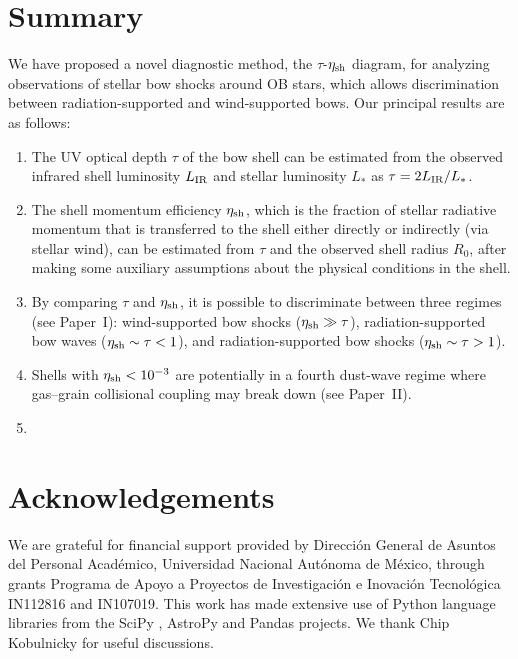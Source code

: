\documentclass[useAMS, usenatbib, a4paper]{mnras}
\begin{document}
\section{Summary}
\label{sec:conclusions}

We have proposed a novel diagnostic method, the \(\tau\)-\(\eta_{\text{sh}}\)
diagram, for analyzing observations of stellar bow shocks around OB
stars, which allows discrimination between radiation-supported and
wind-supported bows.  Our principal results are as follows:
\begin{enumerate}[1.]
\item The UV optical depth \(\tau\) of the bow shell can be estimated
  from the observed infrared shell luminosity \(L_{\text{IR}}\) and stellar
  luminosity \(L_*\) as \(\tau = 2 L_{\text{IR}}/L_*\).
\item The shell momentum efficiency \(\eta_{\text{sh}}\), which is the
  fraction of stellar radiative momentum that is transferred to the
  shell either directly or indirectly (via stellar wind), can be
  estimated from \(\tau\) and the observed shell radius \(R_0\), after
  making some auxiliary assumptions about the physical conditions in
  the shell.
\item By comparing \(\tau\) and \(\eta_{\text{sh}}\), it is possible to
  discriminate between three regimes (see Paper~I): wind-supported bow
  shocks (\(\eta_{\text{sh}} \gg \tau\)), radiation-supported bow waves
  (\(\eta_{\text{sh}} \sim \tau < 1\)), and radiation-supported bow shocks
  (\(\eta_{\text{sh}} \sim \tau > 1\)).
\item Shells with \(\eta_{\text{sh}} < \num{e-3}\) are potentially in a fourth
  dust-wave regime where gas--grain collisional coupling may break
  down (see Paper~II).
\item 
\end{enumerate}


\section*{Acknowledgements}
We are grateful for financial support provided by Dirección General de
Asuntos del Personal Académico, Universidad Nacional Autónoma de
México, through grants Programa de Apoyo a Proyectos de Investigación
e Inovación Tecnológica IN112816 and IN107019.  This work has made
extensive use of Python language libraries from the SciPy
\citep{Jones:2001a}, AstroPy \citep{Astropy-Collaboration:2013a,
  Astropy-Collaboration:2018a} and Pandas \citep{McKinney:2010a}
projects.  We thank Chip Kobulnicky for useful discussions.
\end{document}
